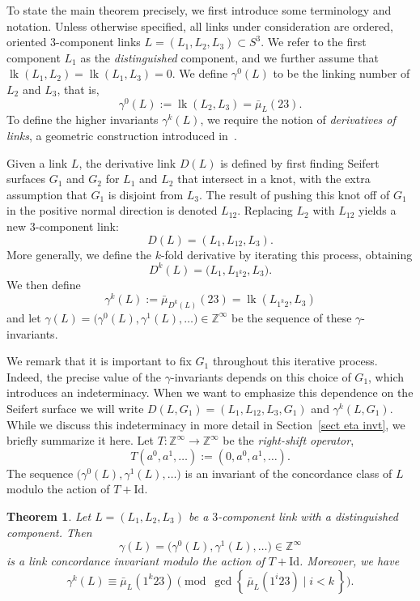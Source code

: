 \documentclass[a4paper, 11pt]{amsart}
\newtheorem{theorem}{Theorem}[section]
\theoremstyle{definition}
\newcommand{\Z}{\mathbb{Z}}
\newcommand{\lk}{\operatorname{lk}}
\begin{document}
To state the main theorem precisely, we first introduce some terminology and notation. Unless otherwise specified, all links under consideration are ordered, oriented $3$-component links
$L=(L_1,L_2,L_3)\subset S^3$. 
We refer to the first component $L_1$ as the \emph{distinguished} component, and we further assume that
$\lk(L_1,L_2)=\lk(L_1,L_3)=0$.
We define $\gamma^0(L)$ to be the linking number of $L_2$ and $L_3$, that is,
\[
\gamma^0(L):=\lk(L_2,L_3)=\bar{\mu}_L(23).
\]
To define the higher invariants $\gamma^k(L)$, we require the notion of \emph{derivatives of links},
a geometric construction introduced in~\cite{C3}.

Given a link $L$, the derivative link $D(L)$ is defined by first finding Seifert surfaces $G_1$ and $G_2$ for $L_1$ and $L_2$ that intersect in a knot, with the extra assumption that $G_1$ is disjoint from $L_3$. The result of pushing this knot off of $G_1$ in the positive normal direction is denoted $L_{12}$. Replacing $L_2$ with $L_{12}$ yields a new $3$-component
link:
\[
D(L)=(L_1,L_{12},L_3).
\]
More generally, we define the $k$-fold derivative by iterating this process, obtaining
\[
D^k(L)=\bigl(L_1,L_{1^k2},L_3\bigr).
\]
We then define
\[
\gamma^k(L):=\bar{\mu}_{D^k(L)}(23)=\lk(L_{1^k2},L_3)
\]
and let $\gamma(L)=\bigl(\gamma^0(L),\gamma^1(L),\dots\bigr)\in \Z^\infty$ be the sequence of these
$\gamma$-invariants.

We remark that it is important to fix $G_1$  throughout this iterative process. Indeed, the precise value of the $\gamma$-invariants  depends on this choice of $G_1$, which introduces an indeterminacy.  When we want to emphasize this dependence on the Seifert surface we will write $D(L, G_1) = (L_1,L_{12}, L_3, G_1)$ and $\gamma^k(L, G_1)$. While we discuss this indeterminacy in more detail
in Section~\ref{sect eta invt}, we briefly summarize it here. Let $T\colon \Z^\infty\to\Z^\infty$ be the
\emph{right-shift operator},
\[
T(a^0,a^1,\dots):=(0,a^0,a^1,\dots).
\]
The sequence $\bigl(\gamma^0(L),\gamma^1(L),\dots\bigr)$ is an invariant of the concordance class of $L$
modulo the action of $T+\mathrm{Id}$.

\begin{theorem}\label{thm:main}
Let $L=(L_1,L_2,L_3)$ be a $3$-component link with a distinguished component. Then
\[
\gamma(L)=\bigl(\gamma^0(L),\gamma^1(L),\ldots\bigr)\in \Z^\infty
\]
is a link concordance invariant modulo the action of $T+\mathrm{Id}$. Moreover, we have
\[
\gamma^k(L)\equiv \bar{\mu}_L(1^k23)
\pmod{\gcd\left\{\, \bar{\mu}_L(1^i23)\mid i<k \,\right\}}.
\]
\end{theorem}
\end{document}
